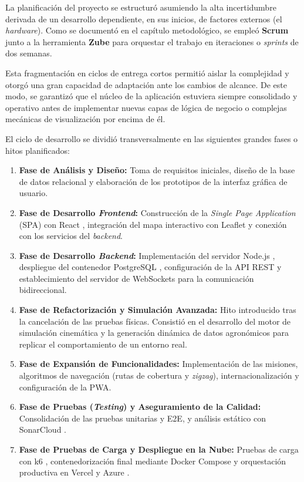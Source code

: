 La planificación del proyecto se estructuró asumiendo la alta incertidumbre derivada de un desarrollo dependiente, en sus inicios, de factores externos (el \textit{hardware}). Como se documentó en el capítulo metodológico, se empleó \textbf{Scrum} junto a la herramienta \textbf{Zube} para orquestar el trabajo en iteraciones o \textit{sprints} de dos semanas.

Esta fragmentación en ciclos de entrega cortos permitió aislar la complejidad y otorgó una gran capacidad de adaptación ante los cambios de alcance. De este modo, se garantizó que el núcleo de la aplicación estuviera siempre consolidado y operativo antes de implementar nuevas capas de lógica de negocio o complejas mecánicas de visualización por encima de él.

El ciclo de desarrollo se dividió transversalmente en las siguientes grandes fases o hitos planificados:
\begin{enumerate}
    \item \textbf{Fase de Análisis y Diseño:} Toma de requisitos iniciales, diseño de la base de datos relacional y elaboración de los prototipos de la interfaz gráfica de usuario.
    \item \textbf{Fase de Desarrollo \textit{Frontend}:} Construcción de la \textit{Single Page Application} (SPA) con React \cite{react}, integración del mapa interactivo con Leaflet \cite{leaflet} y conexión con los servicios del \textit{backend}.
    \item \textbf{Fase de Desarrollo \textit{Backend}:} Implementación del servidor Node.js \cite{nodejs}, despliegue del contenedor PostgreSQL \cite{postgresql}, configuración de la API REST y establecimiento del servidor de WebSockets para la comunicación bidireccional.
    \item \textbf{Fase de Refactorización y Simulación Avanzada:} Hito introducido tras la cancelación de las pruebas físicas. Consistió en el desarrollo del motor de simulación cinemática y la generación dinámica de datos agronómicos para replicar el comportamiento de un entorno real.
    \item \textbf{Fase de Expansión de Funcionalidades:} Implementación de las misiones, algoritmos de navegación (rutas de cobertura y \textit{zigzag}), internacionalización y configuración de la PWA.
    \item \textbf{Fase de Pruebas (\textit{Testing}) y Aseguramiento de la Calidad:} Consolidación de las pruebas unitarias y E2E, y análisis estático con SonarCloud \cite{sonarqube}.
    \item \textbf{Fase de Pruebas de Carga y Despliegue en la Nube:} Pruebas de carga con k6 \cite{k6}, contenedorización final mediante Docker \cite{docker} Compose y orquestación productiva en Vercel \cite{vercel} y Azure \cite{azure}.
\end{enumerate}

